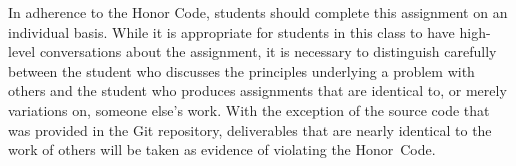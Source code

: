 In adherence to the Honor Code, students should complete this assignment on an individual basis. While it is appropriate
for students in this class to have high-level conversations about the assignment, it is necessary to distinguish
carefully between the student who discusses the principles underlying a problem with others and the student who produces
assignments that are identical to, or merely variations on, someone else's work.  With the exception of the source code
that was provided in the Git repository, deliverables that are nearly identical to the work of others will be taken as
evidence of violating the \mbox{Honor Code}.  


